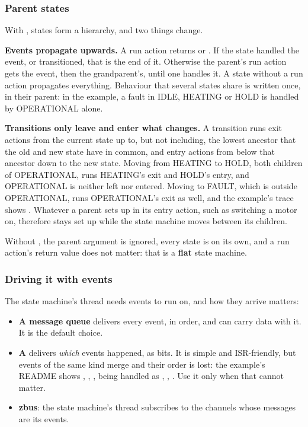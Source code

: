 \subsubsection{Parent states}
With , states form a hierarchy, and two things change.

\textbf{Events propagate upwards.} A run action returns  or
. If the state handled the event, or transitioned, that is the end of it.
Otherwise the parent’s run action gets the event, then the grandparent’s, until one handles it. A
state without a run action propagates everything. Behaviour that several states share is written
once, in their parent: in the example, a fault in IDLE, HEATING or HOLD is handled by OPERATIONAL
alone.

\textbf{Transitions only leave and enter what changes.} A transition runs exit actions from the
current state up to, but not including, the lowest ancestor that the old and new state have in
common, and entry actions from below that ancestor down to the new state. Moving from HEATING to
HOLD, both children of OPERATIONAL, runs HEATING’s exit and HOLD’s entry, and OPERATIONAL is neither
left nor entered. Moving to FAULT, which is outside OPERATIONAL, runs OPERATIONAL’s exit as well,
and the example’s trace shows . Whatever a parent sets up in its entry
action, such as switching a motor on, therefore stays set up while the state machine moves between
its children.

Without , the parent argument is ignored, every state is on its
own, and a run action’s return value does not matter: that is a \textbf{flat} state machine.

\subsubsection{Driving it with events}
The state machine’s thread needs events to run on, and how they arrive matters:

\begin{itemize}
  \item \textbf{A message queue} delivers every event, in order, and can carry data with it. It is the
    default choice.
  \item \textbf{A } delivers \emph{which} events happened, as bits. It is simple and
    ISR-friendly, but events of the same kind merge and their order is lost: the
     example’s README shows , , ,
     being handled as , , . Use it only when that cannot
    matter.
  \item \textbf{zbus}: the state machine’s thread subscribes to the channels whose messages are its events.
\end{itemize}

